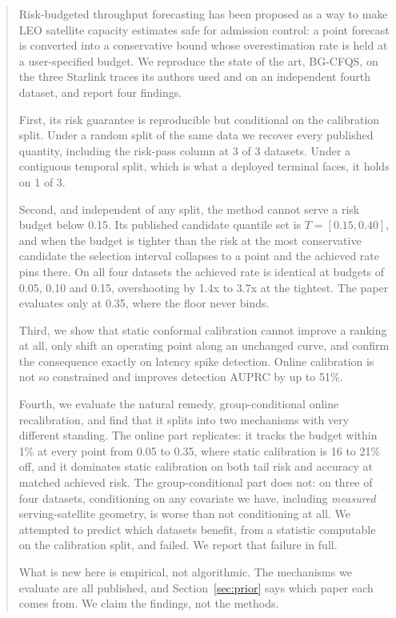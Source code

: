 \documentclass[acmsmall,screen]{acmart}
\begin{document}
\begin{abstract}
Risk-budgeted throughput forecasting has been proposed as a way to make LEO satellite capacity estimates safe for admission control: a point forecast is converted into a conservative bound whose overestimation rate is held at a user-specified budget. We reproduce the state of the art, BG-CFQS, on the three Starlink traces its authors used and on an independent fourth dataset, and report four findings.

First, its risk guarantee is reproducible but conditional on the calibration split. Under a random split of the same data we recover every published quantity, including the risk-pass column at 3 of 3 datasets. Under a contiguous temporal split, which is what a deployed terminal faces, it holds on 1 of 3.

Second, and independent of any split, the method cannot serve a risk budget below 0.15. Its published candidate quantile set is $T = [0.15, 0.40]$, and when the budget is tighter than the risk at the most conservative candidate the selection interval collapses to a point and the achieved rate pins there. On all four datasets the achieved rate is identical at budgets of 0.05, 0.10 and 0.15, overshooting by 1.4x to 3.7x at the tightest. The paper evaluates only at 0.35, where the floor never binds.

Third, we show that static conformal calibration cannot improve a ranking at all, only shift an operating point along an unchanged curve, and confirm the consequence exactly on latency spike detection. Online calibration is not so constrained and improves detection AUPRC by up to 51\%.

Fourth, we evaluate the natural remedy, group-conditional online recalibration, and find that it splits into two mechanisms with very different standing. The online part replicates: it tracks the budget within 1\% at every point from 0.05 to 0.35, where static calibration is 16 to 21\% off, and it dominates static calibration on both tail risk and accuracy at matched achieved risk. The group-conditional part does not: on three of four datasets, conditioning on any covariate we have, including \emph{measured} serving-satellite geometry, is worse than not conditioning at all. We attempted to predict which datasets benefit, from a statistic computable on the calibration split, and failed. We report that failure in full.

What is new here is empirical, not algorithmic. The mechanisms we evaluate are all published, and Section~\ref{sec:prior} says which paper each comes from. We claim the findings, not the methods.
\end{abstract}
\end{document}
